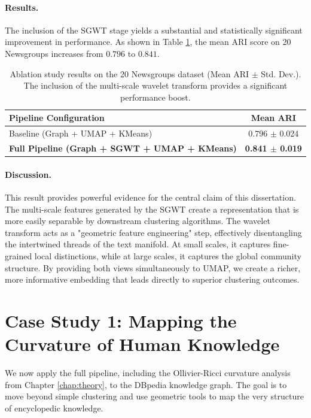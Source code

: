 \paragraph{Results.} The inclusion of the SGWT stage yields a substantial and statistically significant improvement in performance. As shown in Table \ref{tab:ablation_results}, the mean ARI score on 20 Newsgroups increases from $0.796$ to $0.841$.

\begin{table}[h!]
\centering
\caption{Ablation study results on the 20 Newsgroups dataset (Mean ARI $\pm$ Std. Dev.). The inclusion of the multi-scale wavelet transform provides a significant performance boost.}
\label{tab:ablation_results}
\begin{tabular}{@{}lc@{}}
\toprule
\textbf{Pipeline Configuration} & \textbf{Mean ARI} \\ \midrule
Baseline (Graph + UMAP + KMeans) & 0.796 $\pm$ 0.024 \\
\textbf{Full Pipeline (Graph + SGWT + UMAP + KMeans)} & \textbf{0.841 $\pm$ 0.019} \\ \bottomrule
\end{tabular}
\end{table}

\paragraph{Discussion.} This result provides powerful evidence for the central claim of this dissertation. The multi-scale features generated by the SGWT create a representation that is more easily separable by downstream clustering algorithms. The wavelet transform acts as a "geometric feature engineering" step, effectively disentangling the intertwined threads of the text manifold. At small scales, it captures fine-grained local distinctions, while at large scales, it captures the global community structure. By providing both views simultaneously to UMAP, we create a richer, more informative embedding that leads directly to superior clustering outcomes.

\section{Case Study 1: Mapping the Curvature of Human Knowledge}
We now apply the full pipeline, including the Ollivier-Ricci curvature analysis from Chapter \ref{chap:theory}, to the DBpedia knowledge graph. The goal is to move beyond simple clustering and use geometric tools to map the very structure of encyclopedic knowledge.

